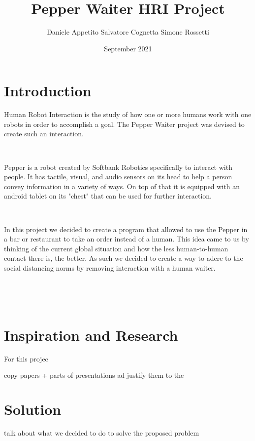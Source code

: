 \documentclass[12pt, letterpaper, twoside]{article}
\title{Pepper Waiter HRI Project}
\author{Daniele Appetito Salvatore Cognetta Simone Rossetti}
\date{September 2021}
\begin{document}
\begin{titlepage}
\maketitle
\end{titlepage}

\tableofcontents

\newpage
    
\newpage
\section{Introduction}

Human Robot Interaction is the study of how one or more humans work with one robots in order to accomplish a goal. The Pepper Waiter project was devised to create such an interaction. 

\

Pepper is a robot created by Softbank Robotics specifically to interact with people. It has tactile, visual, and audio sensors on its head to help a person convey  information in a variety of ways. On top of that it is equipped with an android tablet on its "chest" that can be used for further interaction. 

\

In this project we decided to create a program that allowed to use the Pepper in a bar or restaurant to take an order instead of a human. This idea came to us by thinking of the current global situation and how the less human-to-human contact there is, the better. As such we decided to create a way to adere to the social distancing norms by removing interaction with a human waiter. 

\


\




\section{Inspiration and Research}

For this projec

copy papers + parts of presentations ad justify them to the 

\section{Solution}

talk about what we decided to do to solve the proposed problem
\end{document}
